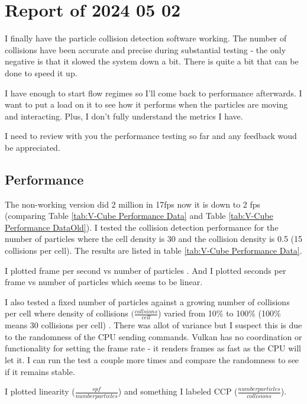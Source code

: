 \section{Report of 2024 05 02}



I finally have the particle collision detection software working. The number of collisions have been accurate and precise during substantial testing -  
the only negative is that it slowed the system down a bit. There is quite a bit that can be done to speed it up. 

I have enough to start flow regimes so I'll come back to performance afterwards. I want to put a load on it to see how it performs when the 
particles are moving and interacting. Plus, I don't fully understand the metrics I have. 

I need to review with you the performance testing so far and any feedback woud be appreciated.

\subsection{Performance}
The non-working version did 2 million in 17fps now it is down to 2 fps (comparing Table \ref{tab:V-Cube Performance Data} and Table \ref{tab:V-Cube Performance DataOld}).
I tested the collision detection performance for the number of particles where the cell density is 30 and the collision density is 0.5 (15 collisions per cell).
The results are listed in table \ref{tab:V-Cube Performance Data}.

I plotted frame per second vs number of particles . And I plotted seconds per frame vs number of particles  which seems to be linear.


I also tested a fixed number of particles against a growing number of collisions per cell where density of collisions $(\frac{collsions}{cell}$) 
varied from 10\% to 100\% (100\% means 30 collisions per cell) . There was allot of variance but I suspect this is due to the randomness of the
CPU sending commands. Vulkan has no coordination or functionality for setting the frame rate - it renders frames as fast as the CPU will let it.
I can run the test a couple more times and compare the randomness to see if it remains stable.

I plotted linearity ($\frac{spf}{number particles}$) and something I labeled CCP ($\frac{number particles}{collisions}$). 

